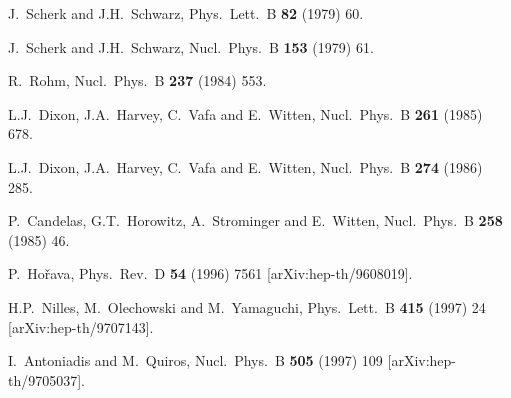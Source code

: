 \documentclass[a4paper,12pt]{article}
\begin{document}
\vspace{2cm}
\begin{thebibliography}{99}

J.~Scherk and J.H.~Schwarz,
Phys.\ Lett.\ B {\bf 82} (1979) 60.

J.~Scherk and J.H.~Schwarz,
Nucl.\ Phys.\ B {\bf 153} (1979) 61.

R.~Rohm,
Nucl.\ Phys.\ B {\bf 237} (1984) 553.

L.J.~Dixon, J.A.~Harvey, C.~Vafa and E.~Witten,
Nucl.\ Phys.\ B {\bf 261} (1985) 678.

L.J.~Dixon, J.A.~Harvey, C.~Vafa and E.~Witten,
Nucl.\ Phys.\ B {\bf 274} (1986) 285.

P.~Candelas, G.T.~Horowitz, A.~Strominger and E.~Witten,
Nucl.\ Phys.\ B {\bf 258} (1985) 46.

P.~Ho\v rava,
Phys.\ Rev.\ D {\bf 54} (1996) 7561
[arXiv:hep-th/9608019].

H.P.~Nilles, M.~Olechowski and M.~Yamaguchi,
Phys.\ Lett.\ B {\bf 415} (1997) 24
[arXiv:hep-th/9707143].

I.~Antoniadis and M.~Quiros,
Nucl.\ Phys.\ B {\bf 505} (1997) 109
[arXiv:hep-th/9705037].


\end{thebibliography}
\end{document}

